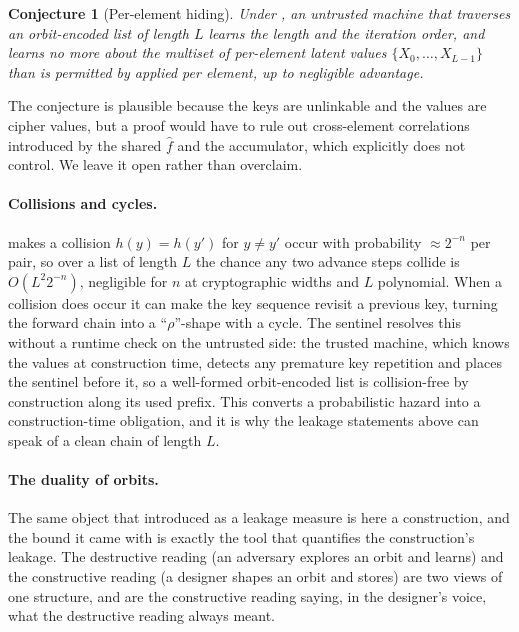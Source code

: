\documentclass[11pt]{article}
\theoremstyle{definition}
\theoremstyle{plain}
\newtheorem{conjecture}[theorem]{Conjecture}
\theoremstyle{definition}
\theoremstyle{remark}
\newcommand{\fhat}{\hat{f}}
\begin{document}
\begin{conjecture}[Per-element hiding]
\label{conj:hiding}
Under , an untrusted machine that traverses an
orbit-encoded list of length $L$ learns the length and the iteration
order, and learns no more about the multiset of per-element latent
values $\{X_0, \ldots, X_{L-1}\}$ than is permitted by
 applied per element, up to negligible
advantage.
\end{conjecture}

The conjecture is plausible because the keys are unlinkable and the
values are cipher values, but a proof would have to rule out
cross-element correlations introduced by the shared $\fhat$ and the
accumulator, which  explicitly does not control.
We leave it open rather than overclaim.

\paragraph{Collisions and cycles.}  makes a collision $h(y)
= h(y')$ for $y \neq y'$ occur with probability $\approx 2^{-n}$ per
pair, so over a list of length $L$ the chance any two advance steps
collide is $O(L^2 2^{-n})$, negligible for $n$ at cryptographic widths
and $L$ polynomial. When a collision does occur it can make the key
sequence revisit a previous key, turning the forward chain into a
\enquote{$\rho$}-shape with a cycle. The sentinel resolves this
without a runtime check on the untrusted side: the trusted machine,
which knows the values at construction time, detects any premature key
repetition and places the sentinel before it, so a well-formed
orbit-encoded list is collision-free by construction along its used
prefix. This converts a probabilistic hazard into a construction-time
obligation, and it is why the leakage statements above can speak of a
clean chain of length $L$.

\paragraph{The duality of orbits.} The same object that
 introduced as a leakage measure is here a
construction, and the bound it came with is exactly the tool that
quantifies the construction's leakage. The destructive reading (an
adversary explores an orbit and learns) and the constructive reading
(a designer shapes an orbit and stores) are two views of one
structure, and  are the
constructive reading saying, in the designer's voice, what the
destructive reading always meant.
\end{document}
